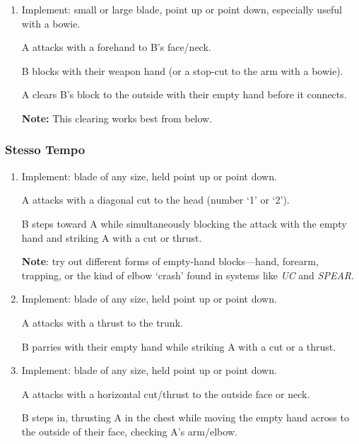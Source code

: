 \documentclass[article, 12pt, a4paper]{memoir}
\begin{document}
\begin{enumerate}
        A rips down through B's block, while either checking their weapons shoulder or delivering a palm strike to their face.

        \textbf{Note}: This drill is not suitable leftie against rightie.

    \item Implement: small or large blade, point up or point down, especially useful with a bowie.

        A attacks with a forehand to B's face/neck.

        B blocks with their weapon hand (or a stop-cut to the arm with a bowie).

        A clears B's block to the outside with their empty hand before it connects.

        \textbf{Note:} This clearing works best from below.

\end{enumerate}

\subsubsection*{Stesso Tempo}
\begin{enumerate}
    \item Implement: blade of any size, held point up or point down.

        A attacks with a diagonal cut to the head (number `1' or `2').

        B steps toward A while simultaneously blocking the attack with the empty hand and striking A with a cut or thrust.

        \textbf{Note}: try out different forms of empty-hand blocks---hand, forearm, trapping, or the kind of elbow `crash' found in systems like \emph{UC} and \emph{SPEAR}.
    \item Implement: blade of any size, held point up or point down.

        A attacks with a thrust to the trunk.

        B parries with their empty hand while striking A with a cut or a thrust.

    \item Implement: blade of any size, held point up or point down.

        A attacks with a horizontal cut/thrust to the outside face or neck.

        B steps in, thrusting A in the chest while moving the empty hand across to the outside of their face, checking A's arm/elbow.
\end{enumerate}
\end{document}
